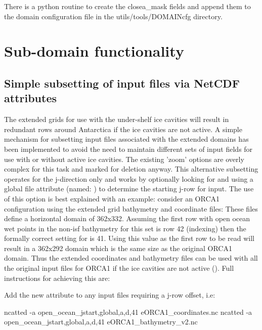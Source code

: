 \documentclass[../main/NEMO_manual]{subfiles}
\begin{document}
There is a python routine to create the closea\_mask fields and append
them to the domain configuration file in the utils/tools/DOMAINcfg directory. 

\section{Sub-domain functionality}
\label{sec:MISC_zoom}

\subsection{Simple subsetting of input files via NetCDF attributes}

The extended grids for use with the under-shelf ice cavities will result in redundant rows around Antarctica if
the ice cavities are not active.
A simple mechanism for subsetting input files associated with the extended domains has been implemented to
avoid the need to maintain different sets of input fields for use with or without active ice cavities.
The existing 'zoom' options are overly complex for this task and marked for deletion anyway.
This alternative subsetting operates for the j-direction only and works by optionally looking for and
using a global file attribute (named: ) to determine the starting j-row for input.
The use of this option is best explained with an example:
consider an ORCA1 configuration using the extended grid bathymetry and coordinate files:
\vspace{-10pt}
\noindent These files define a horizontal domain of 362x332.
Assuming the first row with open ocean wet points in the non-isf bathymetry for this set is row 42
(\fortran indexing) then the formally correct setting for  is 41.
Using this value as the first row to be read will result in a 362x292 domain which is the same size as
the original ORCA1 domain.
Thus the extended coordinates and bathymetry files can be used with all the original input files for ORCA1 if
the ice cavities are not active ().
Full instructions for achieving this are:

\noindent Add the new attribute to any input files requiring a j-row offset, i.e:
\vspace{-10pt}
\begin{cmds}
ncatted  -a open_ocean_jstart,global,a,d,41 eORCA1_coordinates.nc 
ncatted  -a open_ocean_jstart,global,a,d,41 eORCA1_bathymetry_v2.nc
\end{cmds}
 
\end{document}
